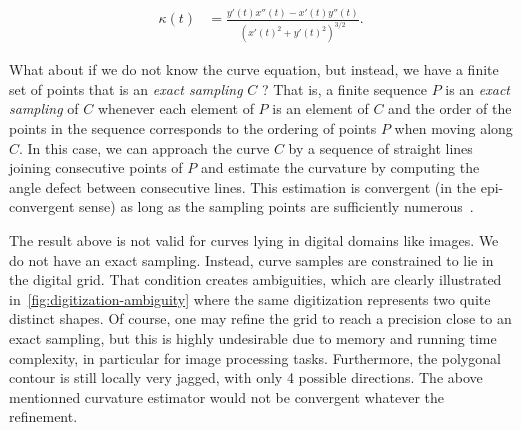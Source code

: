 \documentclass[review]{siamart220329}
\begin{document}
\begin{align*}
\kappa (t) &= \frac{y'(t)x''(t) -x'(t)y''(t)}{(x'(t)^2 + y'(t)^2)^{3/2}}.
\end{align*}

What about if we do not know the curve equation, but instead, we have a finite set of points that is an \emph{exact sampling} $C$ ? That is, a finite sequence $P$ is an {\em exact sampling} of $C$ whenever each element of $P$ is an element of $C$ and the order of the points in the sequence corresponds to the ordering of points $P$ when moving along $C$. In this case, we can approach the curve $C$ by a sequence of straight lines joining consecutive points of $P$ and estimate the curvature by computing the angle defect between consecutive lines. This estimation is convergent (in the epi-convergent sense) as long as the sampling points are sufficiently numerous~\cite{bruckstein01discrete,bruckstein01convergence}.

The result above is not valid for curves lying in digital domains like images. We do not have an exact sampling. Instead, curve samples are constrained to lie in the digital grid. That condition creates ambiguities, which are clearly illustrated in~\cref{fig:digitization-ambiguity} where the same digitization represents two quite distinct shapes. Of course, one may refine the grid to reach a precision close to an exact sampling, but this is highly undesirable due to memory and running time complexity, in particular for image processing tasks. Furthermore, the polygonal contour is still locally very jagged, with only 4 possible directions. The above mentionned curvature estimator would not be convergent whatever the refinement.
\end{document}
